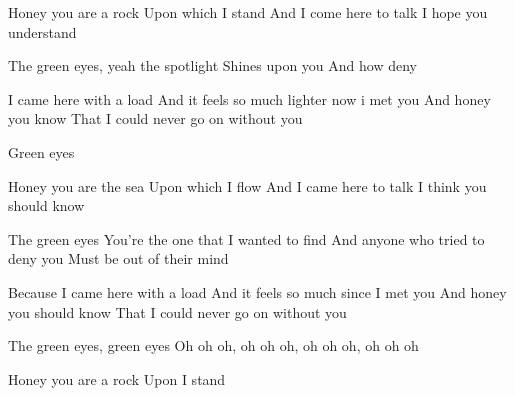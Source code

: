 \resetVars%
%
%
\makeheader%
\lyrics%

Honey you are a rock
Upon which I stand
And I come here to talk
I hope you understand

The green eyes, yeah the spotlight
Shines upon you
And how   deny 

I came here with a load
And it feels so much lighter now i met you
And honey you  know
That I could never go on without you

Green eyes

Honey you are the sea
Upon which I flow
And I came here to talk
I think you should know

The green eyes
You're the one that I wanted to find
And anyone who tried to deny you
Must be out of their mind

\continuechords
{}Because I came here with a load
And it feels so much  since I met you
And honey you should know
That I could never go on without you

The green eyes, green eyes
Oh oh oh, oh oh oh, oh oh oh, oh oh oh

Honey you are a rock
Upon  I stand
\next

